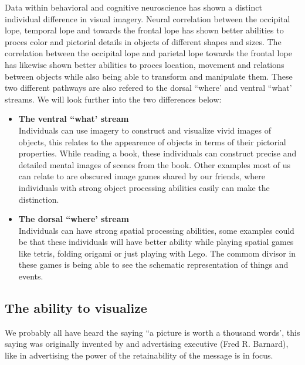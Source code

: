 Data within behavioral and cognitive neuroscience has shown a distinct individual difference in visual imagery. Neural correlation between the occipital lope, temporal lope and towards the frontal lope has shown better abilities to proces color and pictorial details in objects of different shapes and sizes. The correlation between the occipital lope and parietal lope towards the frontal lope has likewise shown better abilities to proces location, movement and relations between objects while also being able to transform and manipulate them.
These two different pathways are also refered to the dorsal ``where' and ventral ``what' streams\cite{harvard2022}.
We will look further into the two differences below:
\begin{itemize}
  \item \textbf{The ventral ``what' stream} \\
   Individuals can use imagery to construct and visualize vivid images of objects, this relates to the appearence of objects in terms of their pictorial properties. While reading a book, these individuals can construct precise and detailed mental images of scenes from the book. Other examples most of us can relate to are obscured image games shared by our friends, where individuals with strong object processing abilities easily can make the distinction\cite{harvard2022}.
  \item \textbf{The dorsal ``where' stream} \\
   Individuals can have strong spatial processing abilities, some examples could be that these individuals will have better ability while playing spatial games like tetris, folding origami or just playing with Lego. The commom divisor in these games is being able to see the schematic representation of things and events\cite{harvard2022}.
\end{itemize}

\subsection{The ability to visualize}\label{subsec:theAbilityToVisualize}
We probably all have heard the saying ``a picture is worth a thousand words', this saying was originally invented by and advertising executive (Fred R. Barnard)\cite{phrases2022}, like in advertising the power of the retainability of the message is in focus. 



